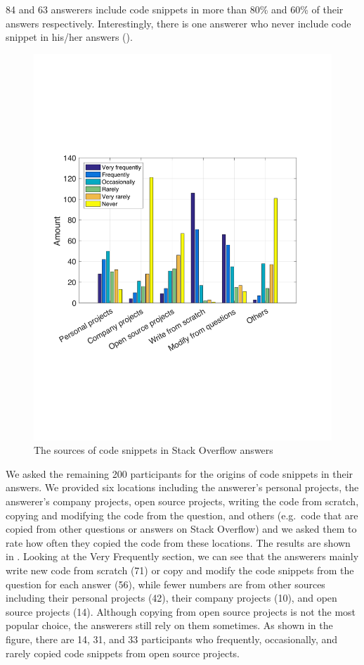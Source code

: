 \documentclass[10pt,journal,compsoc]{IEEEtran}
\begin{document}
84 and 63 answerers include code snippets in more than 80\% and 60\% of
their answers respectively. Interestingly, there is one answerer who never
include code snippet in his/her answers ().

\begin{figure}
	\centering
	\includegraphics[width=0.9\linewidth]{survey_snippet_source}
	\caption{The sources of code snippets in Stack Overflow answers}
	\label{fig:survey_snippet_source}
\end{figure}

We asked the remaining 200 participants for the origins of code snippets in
their answers. We provided six locations including the answerer's personal
projects, the answerer's company projects, open source projects, writing the
code from scratch, copying and modifying the code from the question, and others
(e.g.~code that are copied from other questions or answers on Stack Overflow)
and we asked them to rate how often they copied the code from these locations. The
results are shown in . Looking at the Very
Frequently section, we can see that the answerers mainly write new code from
scratch (71) or copy and modify the code snippets from the question for each answer (56),
while fewer numbers are from other sources including their personal projects
(42), their company projects (10), and open source projects (14). Although
copying from open source projects is not the most popular choice, the answerers
still rely on them sometimes. As shown in the figure, there are 14, 31, and 33
participants who frequently, occasionally, and rarely copied code snippets from
open source projects.
\end{document}
